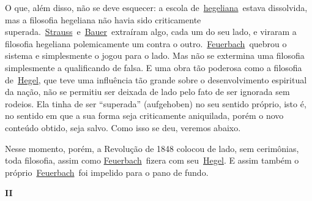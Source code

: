 O que, além disso, não se deve esquecer: a escola
de~\href{https://www.marxists.org/portugues/dicionario/verbetes/h/hegel.htm}{hegeliana}~estava
dissolvida, mas a filosofia hegeliana não havia sido criticamente
superada.~\href{https://www.marxists.org/portugues/dicionario/verbetes/s/strauss_david.htm}{Strauss}~e~\href{https://www.marxists.org/portugues/dicionario/verbetes/b/bauer-b.htm}{Bauer}~extraíram
algo, cada um do seu lado, e viraram a filosofia hegeliana polemicamente
um contra o
outro.~\href{https://www.marxists.org/portugues/dicionario/verbetes/f/feuerbach.htm}{Feuerbach}~quebrou
o sistema e simplesmente o jogou para o lado. Mas não se extermina uma
filosofia simplesmente a qualificando de falsa. E uma obra tão poderosa
como a filosofia
de~\href{https://www.marxists.org/portugues/dicionario/verbetes/h/hegel.htm}{Hegel},
que teve uma influência tão grande sobre o desenvolvimento espiritual da
nação, não se permitiu ser deixada de lado pelo fato de ser ignorada sem
rodeios. Ela tinha de ser ``superada'' (aufgehoben) no seu sentido
próprio, isto é, no sentido em que a sua forma seja criticamente
aniquilada, porém o novo conteúdo obtido, seja salvo. Como isso se deu,
veremos abaixo.

Nesse momento, porém, a Revolução de 1848 colocou de lado, sem
cerimônias, toda filosofia, assim como
\href{https://www.marxists.org/portugues/dicionario/verbetes/f/feuerbach.htm}{Feuerbach}~fizera
com
seu~\href{https://www.marxists.org/portugues/dicionario/verbetes/h/hegel.htm}{Hegel}.
E assim também o
próprio~\href{https://www.marxists.org/portugues/dicionario/verbetes/f/feuerbach.htm}{Feuerbach}~foi
impelido para o pano de fundo.

\textbf{II}

